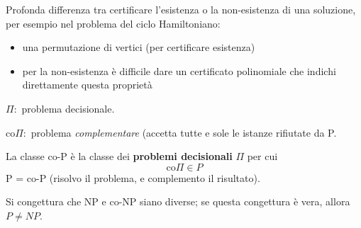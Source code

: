 Profonda differenza tra certificare l'esistenza o la non-esistenza di una soluzione, per esempio nel problema del ciclo Hamiltoniano:
\begin{itemize}
    \item una permutazione di vertici (per certificare esistenza)
    \item per la non-esistenza è difficile dare un certificato polinomiale che indichi direttamente questa proprietà
\end{itemize}

\begin{flushleft}
    $\Pi$:\ problema decisionale.

    $\mathrm{co}\Pi$:\ problema \textit{complementare} (accetta tutte e sole le istanze rifiutate da P.
\end{flushleft}

\noindent La classe co-P è la classe dei \textbf{problemi decisionali} $\Pi$ per cui \[\mathrm{co}\Pi \in \mathit{P}\]
P = co-P (risolvo il problema, e complemento il risultato).\

Si congettura che NP e co-NP siano diverse; se questa congettura è vera, allora $\mathit{P \neq NP}$.\
